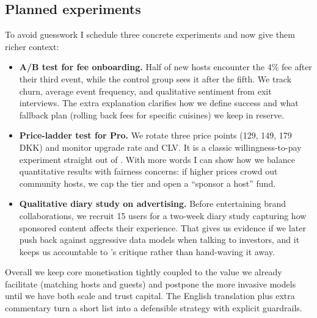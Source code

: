 \subsection*{Planned experiments}
To avoid guesswork I schedule three concrete experiments and now give them richer context:
\begin{itemize}
  \item \textbf{A/B test for fee onboarding.} Half of new hosts encounter the 4\% fee after their third event, while the control group sees it after the fifth. We track churn, average event frequency, and qualitative sentiment from exit interviews. The extra explanation clarifies how we define success and what fallback plan (rolling back fees for specific cuisines) we keep in reserve.
  \item \textbf{Price-ladder test for Pro.} We rotate three price points (129, 149, 179 DKK) and monitor upgrade rate and CLV. It is a classic willingness-to-pay experiment straight out of \citet{ShapiroVarian1999}. With more words I can show how we balance quantitative results with fairness concerns: if higher prices crowd out community hosts, we cap the tier and open a ``sponsor a host'' fund.
  \item \textbf{Qualitative diary study on advertising.} Before entertaining brand collaborations, we recruit 15 users for a two-week diary study capturing how sponsored content affects their experience. That gives us evidence if we later push back against aggressive data models when talking to investors, and it keeps us accountable to \citet{Zuboff2019}'s critique rather than hand-waving it away.
\end{itemize}

Overall we keep core monetisation tightly coupled to the value we already facilitate (matching hosts and guests) and postpone the more invasive models until we have both scale and trust capital. The English translation plus extra commentary turn a short list into a defensible strategy with explicit guardrails.
